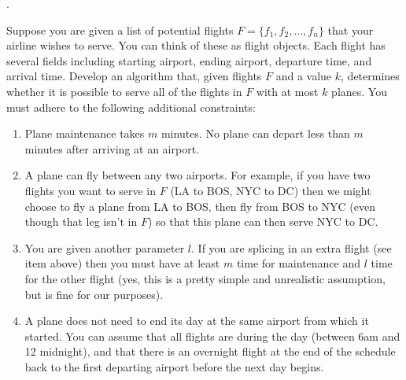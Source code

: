 \documentclass[12pt]{article}
\newcounter{quesnum}
\newcommand{\question}[2][??]{
\begin{list}{\labelitemi}{\leftmargin=2em}
\item [\arabic{quesnum}.] {#2}
\end{list}
\addtocounter{quesnum}{1}
}
\begin{document}
\question[3]{
Suppose you are given a list of potential flights $F=\{f_1,f_2,...,f_n\}$ that your airline wishes to serve. You can think of these as flight objects. Each flight has several fields including starting airport, ending airport, departure time, and arrival time. Develop an algorithm that, given flights $F$ and a value $k$, determines whether it is possible to serve all of the flights in $F$ with at most $k$ planes. You must adhere to the following additional constraints:

\begin{enumerate}
\item Plane maintenance takes $m$ minutes. No plane can depart less than $m$ minutes after arriving at an airport.
\item A plane can fly between any two airports. For example, if you have two flights you want to serve in $F$ (LA to BOS, NYC to DC) then we might choose to fly a plane from LA to BOS, then fly from BOS to NYC (even though that leg isn't in $F$) so that this plane can then serve NYC to DC.
\item  You are given another parameter $l$. If you are splicing in an extra flight (see item above) then you must have at least $m$ time for maintenance and $l$ time for the other flight (yes, this is a pretty simple and unrealistic assumption, but is fine for our purposes).
\item A plane does not need to end its day at the same airport from which it started. You can assume that all flights are during the day (between 6am and 12 midnight), and that there is an overnight flight at the end of the schedule back to the first departing airport before the next day begins.
\end{enumerate}

}



\end{document}

